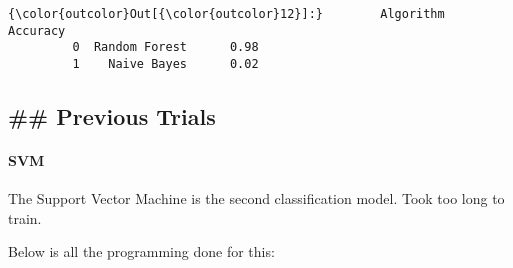 \documentclass[11pt]{article}
\begin{document}
\begin{Verbatim}[commandchars=\\\{\}]
{\color{outcolor}Out[{\color{outcolor}12}]:}        Algorithm  Accuracy
         0  Random Forest      0.98
         1    Naive Bayes      0.02
\end{Verbatim}
            
    \subsection{\#\# Previous Trials}\label{previous-trials}

\paragraph{SVM}\label{svm}

The Support Vector Machine is the second classification model. Took too
long to train.

Below is all the programming done for this:
\end{document}

